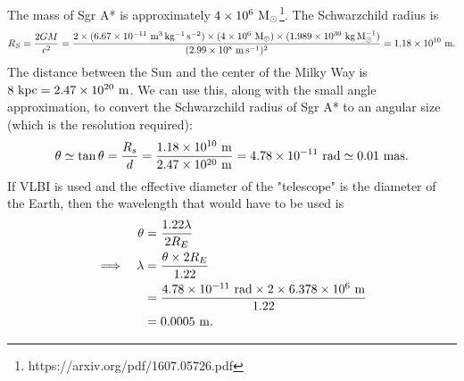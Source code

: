 \documentclass[11pt,letterpaper]{article}
\begin{document}
The mass of Sgr A* is approximately $4\times 10^{6}~{\rm M_\odot}$\footnote{https://arxiv.org/pdf/1607.05726.pdf}. The Schwarzchild radius is
\begin{align*}
    R_S = \frac{2GM}{c^2} = \frac{2\times (6.67\times 10^{-11}~{\rm m^3\,kg^{-1}\,s^{-2}})\times (4\times 10^{6}~{\rm M_\odot})\times (1.989\times 10^{30}~{\rm kg\,M_\odot^{-1}})}{(2.99\times 10^{8}~{\rm m\,s^{-1}})^2} = 1.18\times 10^{10}~{\rm m}.
\end{align*}
The distance between the Sun and the center of the Milky Way is $8~{\rm kpc} = 2.47\times 10^{20}~{\rm m}$. We can use this, along with the small angle approximation, to convert the Schwarzchild radius of Sgr A* to an angular size (which is the resolution required):
\begin{align*}
    \theta \simeq \tan{\theta} = \frac{R_s}{d} = \frac{1.18\times 10^{10}~{\rm m}}{2.47\times 10^{20}~{\rm m}} = 4.78\times 10^{-11}~{\rm rad} \simeq 0.01~{\rm mas}. 
\end{align*}
If VLBI is used and the effective diameter of the "telescope" is the diameter of the Earth, then the wavelength that would have to be used is 
\begin{alignat*}{2}
    &&\theta &= \frac{1.22\lambda}{2R_E} \\
    \implies&&\lambda &= \frac{\theta \times 2R_E}{1.22} \\
    &&&= \frac{4.78\times 10^{-11}~{\rm rad}\times 2\times 6.378\times 10^{6}~{\rm m}}{1.22} \\
    &&&= 0.0005~{\rm m}.
\end{alignat*}
\end{document}

